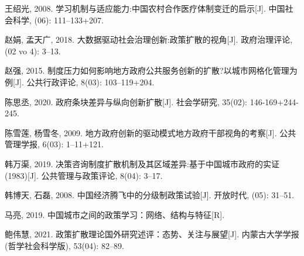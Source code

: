 \documentclass[
  12pt,
]{ctexart}
\newlength{\cslhangindent}
\newlength{\cslentryspacingunit} %
\newenvironment{CSLReferences}[2] %
 {%
  \setlength{\parindent}{0pt}
  \ifodd #1
  \let\oldpar\par
  \def\par{\hangindent=\cslhangindent\oldpar}
  \fi
  \setlength{\parskip}{#2\cslentryspacingunit}
 }%
 {}
\begin{document}
\begin{CSLReferences}{1}{0}
\leavevmode{}%
王绍光, 2008. {学习机制与适应能力:中国农村合作医疗体制变迁的启示}{[}J{]}. 中国社会科学, (06): 111--133+207.

\leavevmode{}%
赵娟, 孟天广, 2018. {大数据驱动社会治理创新:政策扩散的视角}{[}J{]}. 政府治理评论, (02 vo 4): 3--13.

\leavevmode{}%
赵强, 2015. {制度压力如何影响地方政府公共服务创新的扩散?\textemdash\textemdash 以城市网格化管理为例}{[}J{]}. 公共行政评论, 8(03): 103--119+204.

\leavevmode{}%
陈思丞, 2020. {政府条块差异与纵向创新扩散}{[}J{]}. 社会学研究, 35(02): 146-169+244-245.

\leavevmode{}%
陈雪莲, 杨雪冬, 2009. {地方政府创新的驱动模式\textemdash\textemdash 地方政府干部视角的考察}{[}J{]}. 公共管理学报, 6(03): 1--11+121.

\leavevmode{}%
韩万渠, 2019. {决策咨询制度扩散机制及其区域差异:基于中国城市政府的实证(1983)}{[}J{]}. 公共管理与政策评论, 8(04): 3--17.

\leavevmode{}%
韩博天, 石磊, 2008. {中国经济腾飞中的分级制政策试验}{[}J{]}. 开放时代, (05): 31--51.

\leavevmode{}%
马亮, 2019. 中国城市之间的政策学习：网络、结构与特征{[}R{]}.

\leavevmode{}%
鲍伟慧, 2021. {政策扩散理论国外研究述评：态势、关注与展望}{[}J{]}. 内蒙古大学学报(哲学社会科学版), 53(04): 82--89.

\end{CSLReferences}
\end{document}
